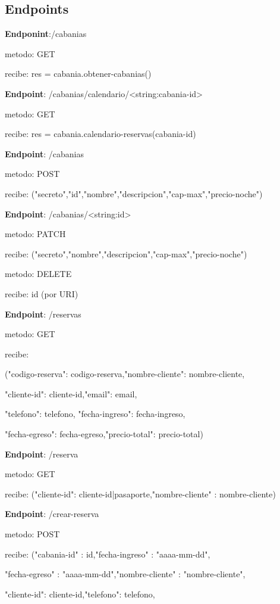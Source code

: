 \subsection{Endpoints}


\textbf{Endponint}:/cabanias

metodo: GET

recibe: res = cabania.obtener-cabanias()


\textbf{Endpoint}: /cabanias/calendario/<string:cabania-id>

metodo: GET

recibe: res = cabania.calendario-reservas(cabania-id)


\textbf{Endpoint}: /cabanias

metodo: POST 

recibe:
("secreto","id","nombre","descripcion","cap-max","precio-noche")


\textbf{Endpoint}: /cabanias/<string:id>

metodo: PATCH 

recibe: ("secreto","nombre","descripcion","cap-max","precio-noche")

metodo: DELETE

recibe: id (por URI)




\textbf{Endpoint}: /reservas

metodo: GET

recibe:

("codigo-reserva": codigo-reserva,"nombre-cliente": nombre-cliente,

"cliente-id": cliente-id,"email": email,

"telefono": telefono, "fecha-ingreso": fecha-ingreso,

"fecha-egreso": fecha-egreso,"precio-total": precio-total)


\textbf{Endpoint}: /reserva

metodo: GET

recibe: ("cliente-id": cliente-id|pasaporte,"nombre-cliente" : nombre-cliente)


\textbf{Endpoint}: /crear-reserva

metodo: POST

recibe: ("cabania-id" : id,"fecha-ingreso" : "aaaa-mm-dd",

"fecha-egreso" : "aaaa-mm-dd","nombre-cliente" : "nombre-cliente",

"cliente-id": cliente-id,"telefono": telefono,

